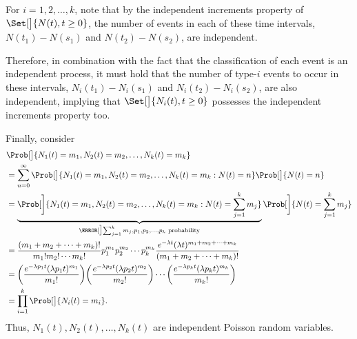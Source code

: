 \begin{Regular}
    \vspace{2mm}

    For $ i=1,2,\ldots,k $, note that by the independent increments property of $ \Set[\big]{N(t),t\ge 0} $,
    the number of events in each of these time intervals, $ N(t_1)-N(s_1) $ and $ N(t_2)-N(s_2) $, are independent.

    \vspace{2mm}

    Therefore, in combination with the fact that the classification of each event is an independent
    process, it must hold that the number of type-$i$ events to occur in these intervals,
    $ N_i(t_1)-N_i(s_1) $ and $ N_i(t_2)-N_i(s_2) $, are also independent, implying that
    $ \Set[\big]{N_i(t),t\ge 0} $ possesses the independent increments property too.

    \vspace{2mm}

    Finally, consider
    \begin{align*}
         & \Prob[\big]{N_1(t)=m_1,N_2(t)=m_2,\ldots,N_k(t)=m_k}                                                                                                                  \\
         & =\sum_{n=0}^{\infty}\Prob[\big]{N_1(t)=m_1,N_2(t)=m_2,\ldots,N_k(t)=m_k\given N(t)=n}\Prob[\big]{N(t)=n}                                                              \\
         & =\underbrace{\Prob[\bigg]{N_1(t)=m_1,N_2(t)=m_2,\ldots,N_k(t)=m_k\given N(t)=\sum_{j=1}^{k}m_j}}_{\MN[\big]{\sum_{j=1}^{k}m_j,p_1,p_2,\ldots,p_k}\text{ probability}}
        \Prob[\bigg]{N(t)=\sum_{j=1}^{k}m_j}                                                                                                                                     \\
         & =\frac{(m_1+m_2+\cdots+m_k)!}{m_1!m_2!\cdots m_k!}p_1^{m_1}p_2^{m_2}\cdots p_k^{m_k}\frac{e^{-\lambda t}(\lambda t)^{m_1+m_2+\cdots+m_k}}{(m_1+m_2+\cdots+m_k)!}      \\
         & =\biggl(\frac{e^{-\lambda p_1 t}(\lambda p_1 t)^{m_1}}{m_1!}\biggr)\biggl(\frac{e^{-\lambda p_2 t}(\lambda p_2 t)^{m_2}}{m_2!}\biggr)\cdots
        \biggl(\frac{e^{-\lambda p_k t}(\lambda p_k t)^{m_k}}{m_k!}\biggr)                                                                                                       \\
         & =\prod_{i=1}^k \Prob[\big]{N_i(t)=m_i}.
    \end{align*}
    Thus, $ N_1(t),N_2(t),\ldots,N_k(t) $ are independent Poisson random variables.


\end{Regular}
